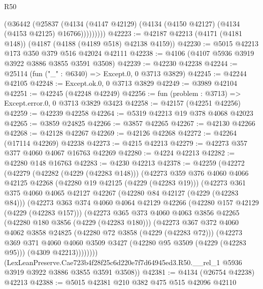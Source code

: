 \begin{lexlean}{R50}
\begin{coremodule}
            (@36442
              (@25837
                (@4134 (@4147 @42129) (@4134 (@4150 @42127) (@4134 (@4153 @42125) @16766)))))))))
@42223 := @42187 @42213 (@4171 (@4181 @148)) (@4187 (@4188 (@4189 @518) @42138 @4159))
@42230 := @5015 @42213 @173 @350 @379 @516 @42024 @42111
@42238 := @4106 (@4107 @5936 @3919 @3922 @3886 @3855 @3591 @3508)
@42239 := @42230 @42238
@42244 := @25114 (fun ("_" : @6340) => Except.{0, 0} @3713 @3829)
@42245 := @42244 @42105
@42248 := Except.ok.{0, 0} @3713 @3829
@42249 := @3989 @42104
@42251 := @42245 (@42248 @42249)
@42256 := fun (problem : @3713) => Except.error.{0, 0} @3713 @3829 @3423
@42258 := @42157 (@42251 @42256)
@42259 := @42239 @42258
@42264 := @5319 @42213 @19 @378 @4068 @42023
@42265 := @3859 @24825
@42266 := @3857 @42265
@42267 := @42130 @42266
@42268 := @42128 @42267
@42269 := @42126 @42268
@42272 := @42264 (@17114 @42269) @42238
@42273 := @4215 @42213
@42279 := @42273 @357 @377 @4060 @4067 @16763 @42269
@42280 := @4224 @42213
@42282 := @42280 @148 @16763
@42283 := @4230 @42213
@42378 := @42259
    (@42272
      (@42279
        (@42282 (@4229 (@42283 @148)))
        (@42273
          @359
          @376
          @4060
          @4066
          @42125
          @42268
          (@42280 @19 @42125 (@4229 (@42283 @19)))
          (@42273
            @361
            @375
            @4060
            @4065
            @42127
            @42267
            (@42280 @84 @42127 (@4229 (@42283 @84)))
            (@42273
              @363
              @374
              @4060
              @4064
              @42129
              @42266
              (@42280 @157 @42129 (@4229 (@42283 @157)))
              (@42273
                @365
                @373
                @4060
                @4063
                @3856
                @42265
                (@42280 @180 @3856 (@4229 (@42283 @180)))
                (@42273
                  @367
                  @372
                  @4060
                  @4062
                  @3858
                  @24825
                  (@42280 @72 @3858 (@4229 (@42283 @72)))
                  (@42273
                    @369
                    @371
                    @4060
                    @4060
                    @3509
                    @3427
                    (@42280 @95 @3509 (@4229 (@42283 @95)))
                    (@4309 @42213))))))))
      (LexLeanPreserve.Cae723b4f28f25c6d220e7f7d64945ed3.R50.__rel_1
        @5936
        @3919
        @3922
        @3886
        @3855
        @3591
        @3508))
@42381 := @4134 (@26754 @42238) @42213
@42388 := @5015 @42381 @210 @382 @475 @515 @42096 @42110

\end{coremodule}
\end{lexlean}
